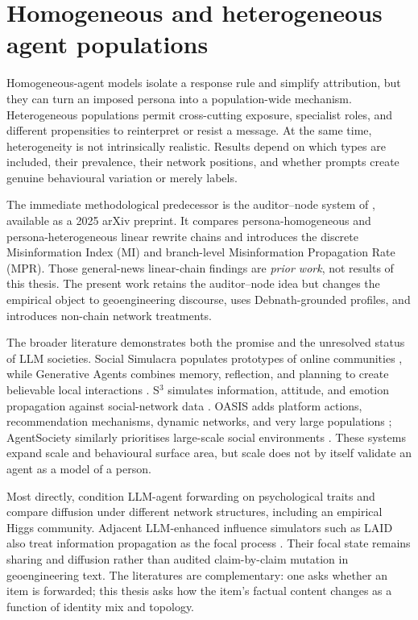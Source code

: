 \section{Homogeneous and heterogeneous agent populations}
\label{sec:lit-heterogeneity}

Homogeneous-agent models isolate a response rule and simplify attribution, but
they can turn an imposed persona into a population-wide mechanism.
Heterogeneous populations permit cross-cutting exposure, specialist roles, and
different propensities to reinterpret or resist a message.  At the same time,
heterogeneity is not intrinsically realistic.  Results depend on which types are
included, their prevalence, their network positions, and whether prompts create
genuine behavioural variation or merely labels.

The immediate methodological predecessor is the auditor--node system of
\textcite{maurya2025simulating}, available as a 2025 arXiv preprint.  It compares persona-homogeneous and persona-heterogeneous linear rewrite
chains and introduces the discrete Misinformation Index (MI) and branch-level
Misinformation Propagation Rate (MPR).  Those general-news linear-chain findings
are \emph{prior work}, not results of this thesis.  The present work retains the
auditor--node idea but changes the empirical object to geoengineering discourse,
uses Debnath-grounded profiles, and introduces non-chain network treatments.

The broader literature demonstrates both the promise and the unresolved status
of LLM societies.  Social Simulacra populates prototypes of online communities
\parencite{park2022simulacra}, while Generative Agents combines memory,
reflection, and planning to create believable local interactions
\parencite{park2023generative}.  S$^3$ simulates information, attitude, and
emotion propagation against social-network data \parencite{gao2023s3}.  OASIS
adds platform actions, recommendation mechanisms, dynamic networks, and very
large populations \parencite{yang2024oasis}; AgentSociety similarly prioritises
large-scale social environments \parencite{piao2025agentsociety}.  These systems
expand scale and behavioural surface area, but scale does not by itself validate
an agent as a model of a person.

Most directly, \textcite{li2026diffusion} condition LLM-agent forwarding on
psychological traits and compare diffusion under different network structures,
including an empirical Higgs community. Adjacent LLM-enhanced influence
simulators such as LAID also treat information propagation as the focal
process \parencite{hu2024laid}. Their focal state remains sharing and
diffusion rather than audited claim-by-claim mutation in geoengineering text.  The
literatures are complementary: one asks whether an item is forwarded; this
thesis asks how the item's factual content changes as a function of identity
mix and topology.

